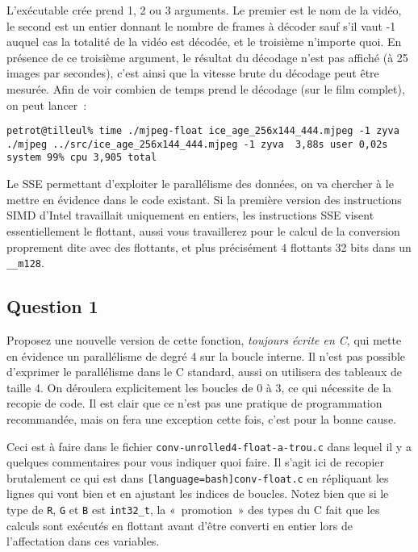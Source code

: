 \documentclass[a4paper,12pt]{article}
\begin{document}
L'exécutable crée prend 1, 2 ou 3 arguments.
Le premier est le nom de la vidéo, le second est un entier donnant le nombre de frames à décoder sauf s'il vaut -1 auquel cas la totalité de la vidéo est décodée, et le troisième n'importe quoi.
En présence de ce troisième argument, le résultat du décodage n'est pas affiché (à 25 images par secondes), c'est ainsi que la vitesse brute du décodage peut être mesurée. 
Afin de voir combien de temps prend le décodage (sur le film complet), on peut lancer~:
\small
\begin{verbatim}
petrot@tilleul% time ./mjpeg-float ice_age_256x144_444.mjpeg -1 zyva
./mjpeg ../src/ice_age_256x144_444.mjpeg -1 zyva  3,88s user 0,02s system 99% cpu 3,905 total
\end{verbatim}
\normalsize

Le SSE permettant d'exploiter le parallélisme des données, on va chercher à le mettre en évidence dans le code existant.
Si la première version des instructions SIMD d'Intel travaillait uniquement en entiers, les instructions SSE visent essentiellement le flottant, aussi vous travaillerez pour le calcul de la conversion proprement dite avec des flottants, et plus précisément 4 flottants 32 bits dans un \lstinline{__m128}. 

\subsection*{Question 1}
Proposez une nouvelle version de cette fonction, \emph{toujours écrite en C}, qui mette en évidence un parallélisme de degré 4 sur la boucle interne.
Il n'est pas possible d'exprimer le parallélisme dans le C standard, aussi on utilisera des tableaux de taille 4.
On déroulera explicitement les boucles de 0 à 3, ce qui nécessite de la recopie de code.
Il est clair que ce n'est pas une pratique de programmation recommandée, mais on fera une exception cette fois, c'est pour la bonne cause.

Ceci est à faire dans le fichier \lstinline[language=bash]{conv-unrolled4-float-a-trou.c} dans lequel il y a quelques commentaires pour vous indiquer quoi faire.
Il s'agit ici de recopier brutalement ce qui est dans \lstinline{[language=bash]conv-float.c} en répliquant les lignes qui vont bien et en ajustant les indices de boucles.
Notez bien que si le type de \lstinline{R}, \lstinline{G} et \lstinline{B} est \lstinline{int32_t}, la «~promotion~» des types du C fait que les calculs sont exécutés en flottant avant d'être converti en entier lors de l'affectation dans ces variables.
\end{document}
